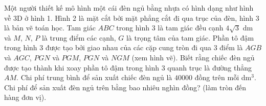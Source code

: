 \begin{ex}%
	Một người thiết kế mô hình một cái đèn ngủ bằng nhựa có hình dạng như hình về 3D ở hình 1. Hình 2 là mặt cắt bởi mặt phẳng cắt đi qua trục của đèn, hình 3 là bản vẽ toán học. Tam giác $ABC$ trong hình 3 là tam giác đều cạnh $4\sqrt{3}$ dm và $M$, $N$, $P$ là trung điểm các cạnh, $G$ là trọng tâm của tam giác. Phần tô đậm trong hình 3 được tạo bởi giao nhau của các cặp cung tròn đi qua $3$ điểm là $AGB$ và $AGC$, $PGN$ và $PGM$, $PGN$ và $NGM$ (xem hình vẽ). Biết rằng chiếc đèn ngủ được tạo thành khi xoay phần tô đậm trong hình 3 quanh trục là đường thẳng $AM$. Chi phí trung bình để sản xuất chiếc đèn ngủ là $40 000$ đồng trên mỗi dm$^3$. Chi phí để sản xuất đèn ngủ trên bằng bao nhiêu nghìn đồng? (làm tròn đến hàng đơn vị).
	\begin{center}
	\end{center}
\end{ex}

%

